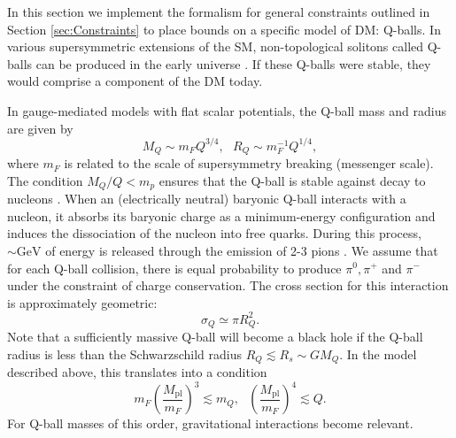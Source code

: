 \documentclass[twocolumn,showpacs,preprintnumbers,amsmath,amssymb,prd]{revtex4}
\newcommand{\Mpl}{M_{\text{pl}}}
\def\r{\right)}
\def\l{\left(}
\begin{document}
In this section we implement the formalism for general constraints outlined in Section \ref{sec:Constraints} to place bounds on a specific model of DM: Q-balls. In various supersymmetric extensions of the SM, non-topological solitons called Q-balls can be produced in the early universe \cite{Coleman:1985ki, Kusenko:1997si}. If these Q-balls were stable, they would comprise a component of the DM today.

In gauge-mediated models with flat scalar potentials, the Q-ball mass and radius are given by
\begin{equation}
\label{eq:Qballprop}
M_Q \sim m_F Q^{3/4}, ~~~ R_Q \sim m_F^{-1} Q^{1/4},
\end{equation}
where $m_F$ is related to the scale of supersymmetry breaking (messenger scale). The condition $M_Q/Q < m_p$ ensures that the Q-ball is stable against decay to nucleons \cite{Dine:2003ax}. When an (electrically neutral) baryonic Q-ball interacts with a nucleon, it absorbs its baryonic charge as a minimum-energy configuration and induces the dissociation of the nucleon into free quarks. During this process, $\sim \text{GeV}$ of energy is released through the emission of 2-3 pions \cite{Dine:2003ax}. We assume that for each Q-ball collision, there is equal probability to produce $\pi^0, \pi^+$ and $\pi^-$ under the constraint of charge conservation. The cross section for this interaction is approximately geometric:
\begin{equation}
\sigma_Q \simeq \pi R_Q^2.
\end{equation}
Note that a sufficiently massive Q-ball will become a black hole if the Q-ball radius is less than the Schwarzschild radius $R_Q \lesssim R_s \sim G M_Q$. In the model described above, this translates into a condition
\begin{equation}
m_F \l\frac{\Mpl}{m_F}\r^3 \lesssim m_Q, ~~~ \l\frac{\Mpl}{m_F}\r^4 \lesssim Q.
\end{equation}
For Q-ball masses of this order, gravitational interactions become relevant.
\end{document}
